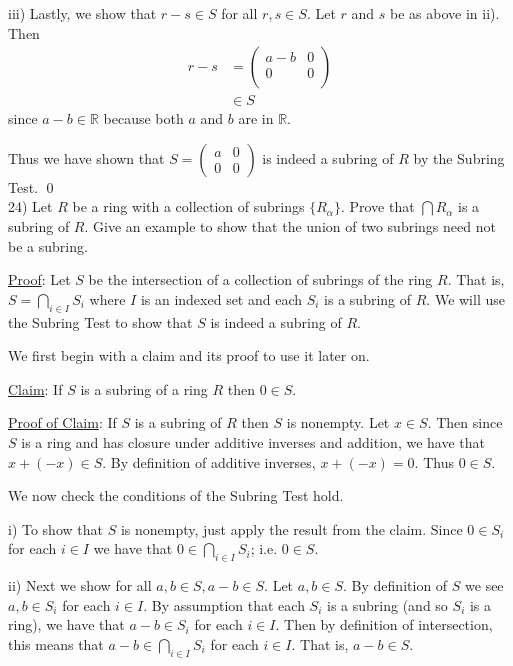 \documentclass{article}
\begin{document}
iii) Lastly, we show that $r - s \in S$ for all $r, s \in S$. Let $r$ and $s$ be as above in ii). Then
\begin{align*}
	r - s &=
	\begin{pmatrix}
		a - b & 0 \\ 
		0 & 0 \\
	\end{pmatrix} \\
	& \in S
\end{align*} since $a - b \in \mathbb{R}$ because both $a$ and $b$ are in $\mathbb{R}$.

Thus we have shown that $S =
\begin{pmatrix}
a & 0 \\
0 & 0
\end{pmatrix}$ is indeed a subring of $R$ by the Subring Test. \qed \\

24) Let $R$ be a ring with a collection of subrings $\{R_{\alpha}\}$. Prove that $\bigcap R_{\alpha}$ is a subring of $R$. Give an example to show that the union of two subrings need not be a subring.

\underline{Proof}: Let $S$ be the intersection of a collection of subrings of the ring $R$. That is, $S = \underset{i \in I}{\bigcap} S_i$ where $I$ is an indexed set and each $S_i$ is a subring of $R$. We will use the Subring Test to show that $S$ is indeed a subring of $R$.

We first begin with a claim and its proof to use it later on.

\underline{Claim}: If $S$ is a subring of a ring $R$ then $0 \in S$.

\underline{Proof of Claim}: If $S$ is a subring of $R$ then $S$ is nonempty. Let $x \in S$. Then since $S$ is a ring and has closure under additive inverses and addition, we have that $x + (-x) \in S$. By definition of additive inverses, $x + (-x) = 0$. Thus $0 \in S$. \pagebreak

We now check the conditions of the Subring Test hold.

i) To show that $S$ is nonempty, just apply the result from the claim. Since $0 \in S_i$ for each $i \in I$ we have that $0 \in \underset{i \in I}{\bigcap} S_i$; i.e. $0 \in S$.

ii) Next we show for all $a, b \in S, a - b \in S$. Let $a, b \in S$. By definition of $S$ we see $a, b \in S_i$ for each $i \in I$. By assumption that each $S_i$ is a subring (and so $S_i$ is a ring), we have that $a - b \in S_i$ for each $i \in I$. Then by definition of intersection, this means that $a - b \in \underset{i \in I}{\bigcap} S_i$ for each $i \in I$. That is, $a - b \in S$.
\end{document}
